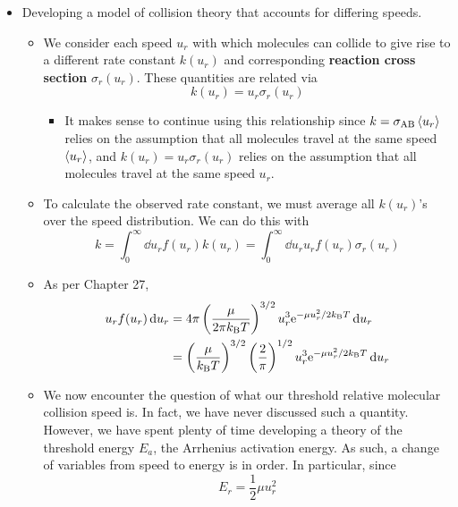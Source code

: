 \documentclass[../notes.tex]{subfiles}
\begin{document}
\begin{itemize}
\begin{itemize}
\begin{itemize}
        \end{itemize}
    \end{itemize}
    \item Developing a model of collision theory that accounts for differing speeds.
    \begin{itemize}
        \item We consider each speed $u_r$ with which molecules can collide to give rise to a different rate constant $k(u_r)$ and corresponding \textbf{reaction cross section} $\sigma_r(u_r)$. These quantities are related via
        \begin{equation*}
            k(u_r) = u_r\sigma_r(u_r)
        \end{equation*}
        \begin{itemize}
            \item It makes sense to continue using this relationship since $k=\sigma_{\ce{A}\ce{B}}\prb{u_r}$ relies on the assumption that all molecules travel at the same speed $\prb{u_r}$, and $k(u_r)=u_r\sigma_r(u_r)$ relies on the assumption that all molecules travel at the same speed $u_r$.
        \end{itemize}
        \item To calculate the observed rate constant, we must average all $k(u_r)$'s over the speed distribution. We can do this with
        \begin{equation*}
            k = \int_0^\infty\dd{u_r}f(u_r)k(u_r)
            = \int_0^\infty\dd{u_r}u_rf(u_r)\sigma_r(u_r)
        \end{equation*}
        \item As per Chapter 27,
        \begin{align*}
            u_rf(u_r)\dd{u_r} &= 4\pi\left( \frac{\mu}{2\pi\kB T} \right)^{3/2}u_r^3\e[-\mu u_r^2/2\kB T]\dd{u_r}\\
            &= \left( \frac{\mu}{\kB T} \right)^{3/2}\left( \frac{2}{\pi} \right)^{1/2}u_r^3\e[-\mu u_r^2/2\kB T]\dd{u_r}
        \end{align*}
        \item We now encounter the question of what our threshold relative molecular collision speed is. In fact, we have never discussed such a quantity. However, we have spent plenty of time developing a theory of the threshold energy $E_a$, the Arrhenius activation energy. As such, a change of variables from speed to energy is in order. In particular, since
        \begin{equation*}
            E_r = \frac{1}{2}\mu u_r^2

\end{equation*}
\end{itemize}
\end{itemize}
\end{document}
